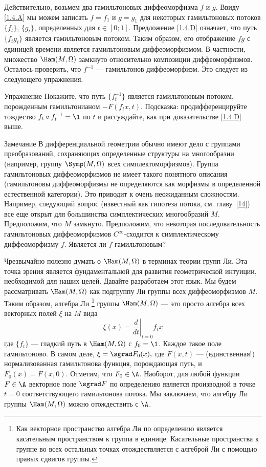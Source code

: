 Действительно, возьмем два гамильтоновых диффеоморфизма $f$ и $g$.
Ввиду \ref{1.4.A} мы можем записать $f = f_1$ и $g = g_1$ для некоторых гамильтоновых потоков $\{f_t\}$, $\{g_t\}$, определенных для $t \in [0; 1]$.
Предложение \ref{1.4.D} означает, что путь $\{f_t g_t\}$ является гамильтоновым потоком.
Таким образом, его отображение $f g$ с единицей времени является гамильтоновым диффеоморфизмом.
В частности, множество $\Ham (M, \Omega)$ замкнуто относительно композиции диффеоморфизмов.
Осталось проверить, что $f^{-1}$ --- гамильтонов диффеоморфизм.
Это следует из следующего упражнения.

\begin{thm*}{Упражнение} Покажите, что путь $\{f_t^{-1}\}$ является гамильтоновым потоком, порожденным гамильтонианом $-F (f_t x, t)$.
Подсказка: продифференцируйте тождество $f_t \circ f_t^{-1} = \1$ по $t$ и рассуждайте, как при доказательстве \ref{1.4.D} выше.
\end{thm*}



\begin{thm}{Замечание}
В дифференциальной геометрии обычно имеют дело с группами преобразований, сохраняющих определенные структуры на многообразии (например, группу $\Symp (M, \Omega)$ всех симплектоморфизмов).
Группа гамильтоновых диффеоморфизмов не имеет такого понятного описания (гамильтоновы диффеоморфизмы не определяются как морфизмы в определенной естественной категории).
Это приводит к очень неожиданным сложностям.
Например, следующий вопрос (известный как гипотеза потока, см. главу~\ref{14}) все еще открыт для большинства симплектических многообразий $M$.
Предположим, что $M$ замкнуто.
Предположим, что некоторая последовательность гамильтоновых диффеоморфизмов $C^\infty$-сходится к симплектическому диффеоморфизму $f$.
Является ли $f$ гамильтоновым?
\end{thm}

Чрезвычайно полезно думать о $\Ham (M, \Omega)$ в терминах теории групп Ли.
Эта точка зрения является фундаментальной для развития геометрической интуиции, необходимой для наших целей.
Давайте разработаем этот язык.
Мы будем рассматривать $\Ham (M, \Omega)$ как подгруппу Ли группы всех диффеоморфизмов $M$.
Таким образом, алгебра Ли%
\footnote{Как векторное пространство алгебра Ли по определению является касательным пространством к
группа в единице.
Касательные пространства к группе во всех остальных точках 
отождествляется с алгеброй Ли с помощью правых сдвигов группы.}
группы $\Ham (M, \Omega)$ --- это просто алгебра всех векторных полей $\xi$ на $M$ вида 
\[\xi(x)=\left.\frac{d}{dt}\right|_{t=0}f_tx\]
где $\{f_t\}$ --- гладкий путь в $\Ham (M, \Omega)$ с $f_0 = \1$.
Каждое такое поле гамильтоново.
В самом деле, $\xi = \sgrad F_0 (x),$ где $F (x, t)$ --- (единственная!) нормализованная гамильтонова функция, порождающая путь, и $F_0 (x) = F (x, 0)$.
Отметим, что $F_0 \in \A$.
Наоборот, для любой функции $F \in \A$ векторное поле $\sgrad F$ по определению является производной в точке $t = 0$ соответствующего гамильтонова потока.
Мы заключаем, что алгебру Ли группы $\Ham (M, \Omega)$ можно отождествить с $\A$.

